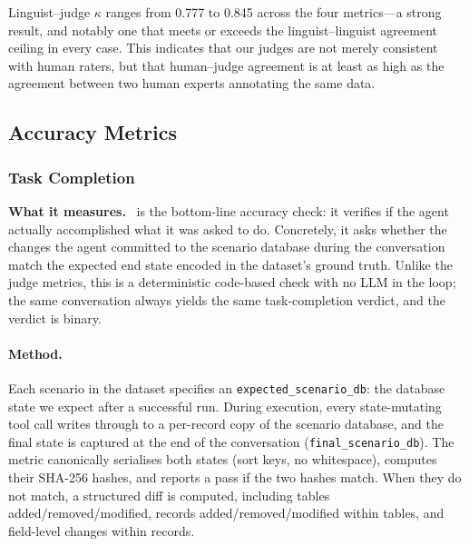 Linguist--judge $\kappa$ ranges from 0.777 to 0.845 across the four
metrics---a strong result, and notably one that meets or exceeds the
linguist--linguist agreement ceiling in every case. This indicates that
our judges are not merely consistent with human raters, but that
human--judge agreement is at least as high as the agreement between two
human experts annotating the same data.





\subsection{Accuracy Metrics}
\subsubsection{Task Completion}
\label{app:metric-task-completion}

\textbf{What it measures.} \metrictaskcompletion~is the bottom-line accuracy check: it verifies if the agent actually accomplished what it was asked to do. Concretely, it asks whether the changes the agent committed to the scenario database during the conversation match the expected end state encoded in the dataset's ground truth. Unlike the judge metrics, this is a deterministic code-based check with no LLM in the loop; the same conversation always yields the same task-completion verdict, and the verdict is binary.

\paragraph{Method.} Each scenario in the dataset specifies an \texttt{expected\_scenario\_db}: the database state we expect after a successful run. During execution, every state-mutating tool call writes through to a per-record copy of the scenario database, and the final state is captured at the end of the conversation (\texttt{final\_scenario\_db}). The metric canonically serialises both states (sort keys, no whitespace), computes their SHA-256 hashes, and reports a pass if the two hashes match. When they do not match, a structured diff is computed, including tables added/removed/modified, records added/removed/modified within tables, and field-level changes within records.

